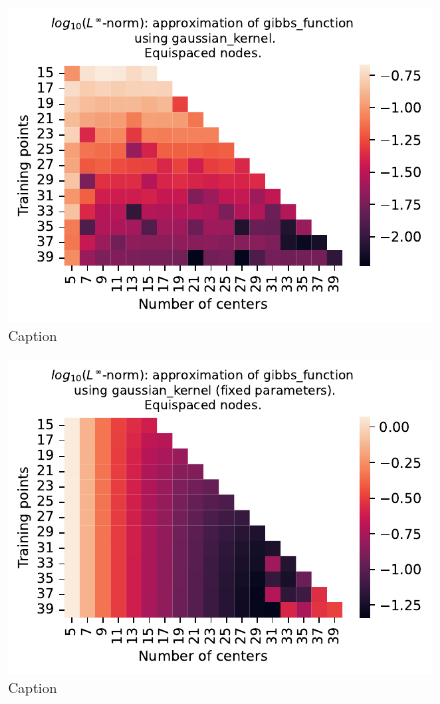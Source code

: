 \documentclass[12pt]{report} %
\begin{document}
\begin{figure}[ht]
  \centering

  \includegraphics[width=.6\textwidth]{imagenes/experiments/1d/variational/gibbs_gaussian_extended.pdf}
  \caption{Caption}
  \label{fig:gibbs-gaussian-extended}
\end{figure}

\begin{figure}[ht]
  \centering

  \includegraphics[width=.6\textwidth]{imagenes/experiments/1d/least_squares/gibbs_exact_solution_fucks_up.pdf}
  \caption{Caption}
  \label{fig:gibbs-gaussian-extended-lstsq}
\end{figure}
\end{document}
